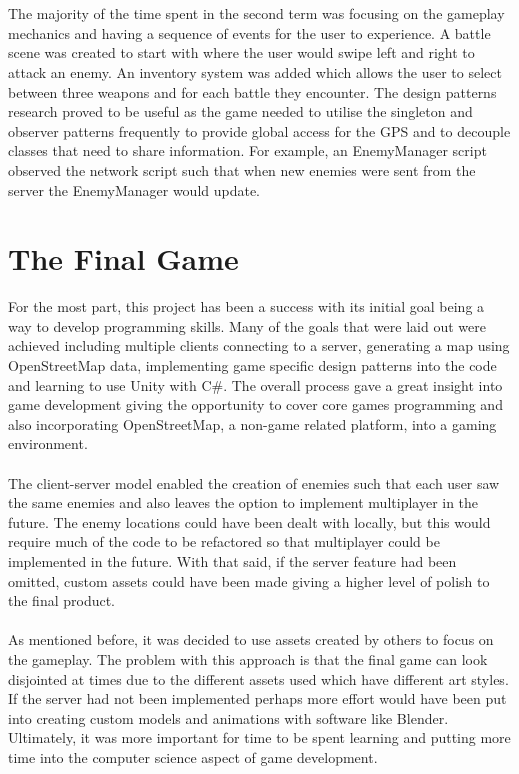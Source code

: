 \documentclass[a4paper]{report}
\begin{document}
\\\\
The majority of the time spent in the second term was focusing on the gameplay mechanics and having a sequence of events for the user to experience. A battle scene was created to start with where the user would swipe left and right to attack an enemy. An inventory system was added which allows the user to select between three weapons and for each battle they encounter. The design patterns research proved to be useful as the game needed to utilise the singleton and observer patterns frequently to provide global access for the GPS and to decouple classes that need to share information. For example, an EnemyManager script observed the network script such that when new enemies were sent from the server the EnemyManager would update. 
\pagebreak
\section{The Final Game}
For the most part, this project has been a success with its initial goal being a way to develop programming skills. Many of the goals that were laid out were achieved including multiple clients connecting to a server, generating a map using OpenStreetMap data, implementing game specific design patterns into the code and learning to use Unity with C\#. The overall process gave a great insight into game development giving the opportunity to cover core games programming and also incorporating OpenStreetMap, a non-game related platform, into a gaming environment.
\\\\
The client-server model enabled the creation of enemies such that each user saw the same enemies and also leaves the option to implement multiplayer in the future. The enemy locations could have been dealt with locally, but this would require much of the code to be refactored so that multiplayer could be implemented in the future. With that said, if the server feature had been omitted, custom assets could have been made giving a higher level of polish to the final product.
\\\\
As mentioned before, it was decided to use assets created by others to focus on the gameplay. The problem with this approach is that the final game can look disjointed at times due to the different assets used which have different art styles. If the server had not been implemented perhaps more effort would have been put into creating custom models and animations with software like Blender. Ultimately, it was more important for time to be spent learning and putting more time into the computer science aspect of game development.
\end{document}
